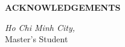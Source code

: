 \newpage

\setcounter{tocdepth}{0}

\begin{center}
    \Large \textbf{ACKNOWLEDGEMENTS}
\end{center}



\noindent
\begin{minipage}[t]{0.35\textwidth}
\end{minipage}
\hfill
\begin{minipage}[t]{0.6\textwidth}
\centering
\fontsize{13pt}{15pt}\selectfont
\textit{Ho Chi Minh City, \makebox[5cm]{\dotfill}}\\
Master's Student
\end{minipage}
